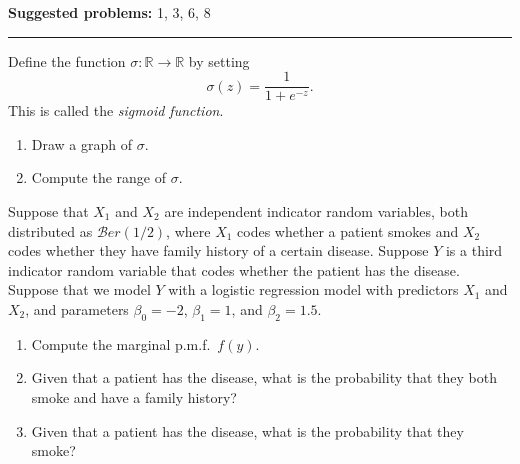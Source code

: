 \documentclass[12pt,reqno]{amsart}
\begin{document}
\textbf{Suggested problems:} 1, 3, 6, 8

\bigskip
\hrule

\bigskip
\prob Define the function $\sigma: \mathbb{R} \to \mathbb{R}$ by setting
\[
	\sigma(z) = \frac{1}{1+e^{-z}}.
\]
This is called the \textit{sigmoid function}. 

\medskip
\begin{enumerate}
\item Draw a graph of $\sigma$.\vfill
\item Compute the range of $\sigma$.\vfill
\end{enumerate}

\prob Suppose that $X_1$ and $X_2$ are independent indicator random variables, both distributed as $\mathcal{B}er(1/2)$, where $X_1$ codes whether a patient smokes and $X_2$ codes whether they have family history of a certain disease. Suppose $Y$ is a third indicator random variable that codes whether the patient has the disease. Suppose that we model $Y$ with a logistic regression model with predictors $X_1$ and $X_2$, and parameters $\beta_0 = -2$, $\beta_1 = 1$, and $\beta_2 = 1.5$.

\begin{enumerate}
\item Compute the marginal p.m.f.\ $f(y)$.\vfill
\item Given that a patient has the disease, what is the probability that they both smoke and have a family history?\vfill
\item Given that a patient has the disease, what is the probability that they smoke?\vfill
\end{enumerate}
\end{document}
